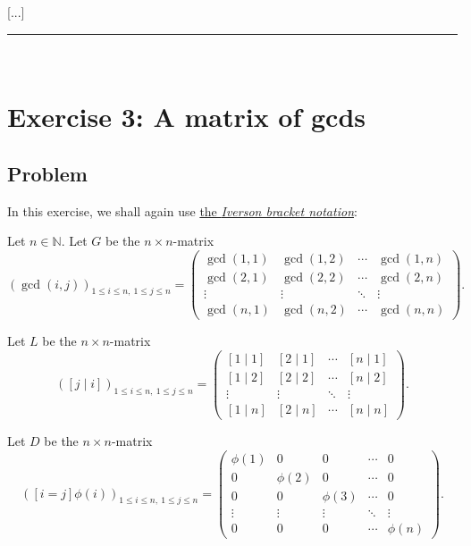 \documentclass[paper=a4, fontsize=12pt]{scrartcl} %
\newcommand{\NN}{\mathbb{N}} %
\newcommand{\tup}[1]{\left( #1 \right)}
\newcommand{\ive}[1]{\left[ #1 \right]}
\newcommand{\horrule}[1]{\rule{\linewidth}{#1}} %
\theoremstyle{plainsl}
\theoremstyle{definition}
\theoremstyle{remark}
\begin{document}
[...]

\horrule{0.3pt} \\[0.4cm]

\section{Exercise 3: A matrix of gcds}

\subsection{Problem}

In this exercise, we shall again use
\href{https://en.wikipedia.org/wiki/Iverson_bracket}{the \textit{Iverson bracket notation}}:

Let $n \in \NN$.
Let $G$ be the $n \times n$-matrix
\[
 \tup{ \gcd\tup{i, j} }_{1 \leq i \leq n, \ 1 \leq j \leq n }
 =
 \begin{pmatrix}   %
  \gcd\tup{1, 1} & \gcd\tup{1, 2} & \cdots & \gcd\tup{1, n} \\
  \gcd\tup{2, 1} & \gcd\tup{2, 2} & \cdots & \gcd\tup{2, n} \\
  \vdots & \vdots & \ddots & \vdots \\
  \gcd\tup{n, 1} & \gcd\tup{n, 2} & \cdots & \gcd\tup{n, n}
 \end{pmatrix} .
\]

Let $L$ be the $n \times n$-matrix
\[
 \tup{ \ive{j \mid i} }_{1 \leq i \leq n, \ 1 \leq j \leq n }
 =
 \begin{pmatrix}
  \ive{1 \mid 1} & \ive{2 \mid 1} & \cdots & \ive{n \mid 1} \\
  \ive{1 \mid 2} & \ive{2 \mid 2} & \cdots & \ive{n \mid 2} \\
  \vdots & \vdots & \ddots & \vdots \\
  \ive{1 \mid n} & \ive{2 \mid n} & \cdots & \ive{n \mid n}
 \end{pmatrix} .
\]

Let $D$ be the $n \times n$-matrix
\[
 \tup{ \ive{i = j} \phi\tup{i} }_{1 \leq i \leq n, \ 1 \leq j \leq n }
 =
 \begin{pmatrix}
  \phi\tup{1} & 0 & 0 & \cdots & 0 \\
  0 & \phi\tup{2} & 0 & \cdots & 0 \\
  0 & 0 & \phi\tup{3} & \cdots & 0 \\
  \vdots & \vdots & \vdots & \ddots & \vdots \\
  0 & 0 & 0 & \cdots & \phi\tup{n}
 \end{pmatrix} .
\]
\end{document}
